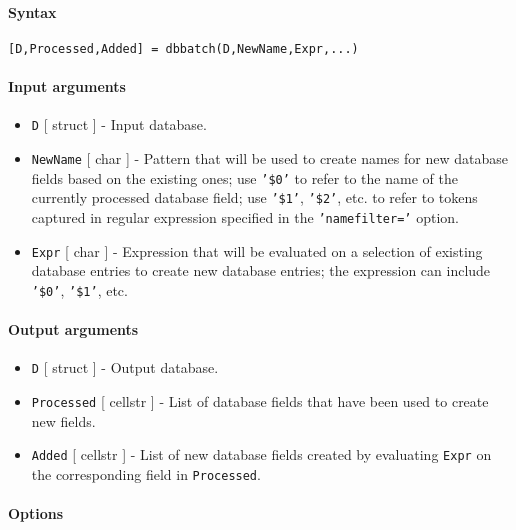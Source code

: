 


	\paragraph{Syntax}

\begin{verbatim}
[D,Processed,Added] = dbbatch(D,NewName,Expr,...)
\end{verbatim}

\paragraph{Input arguments}

\begin{itemize}
\item
  \texttt{D} {[} struct {]} - Input database.
\item
  \texttt{NewName} {[} char {]} - Pattern that will be used to create
  names for new database fields based on the existing ones; use
  \texttt{'\$0'} to refer to the name of the currently processed
  database field; use \texttt{'\$1'}, \texttt{'\$2'}, etc. to refer to
  tokens captured in regular expression specified in the
  \texttt{'namefilter='} option.
\item
  \texttt{Expr} {[} char {]} - Expression that will be evaluated on a
  selection of existing database entries to create new database entries;
  the expression can include \texttt{'\$0'}, \texttt{'\$1'}, etc.
\end{itemize}

\paragraph{Output arguments}

\begin{itemize}
\item
  \texttt{D} {[} struct {]} - Output database.
\item
  \texttt{Processed} {[} cellstr {]} - List of database fields that have
  been used to create new fields.
\item
  \texttt{Added} {[} cellstr {]} - List of new database fields created
  by evaluating \texttt{Expr} on the corresponding field in
  \texttt{Processed}.
\end{itemize}

\paragraph{Options}

